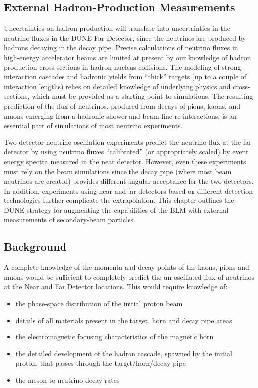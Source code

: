\subsection{External Hadron-Production Measurements}
\label{sec:detectors-nd-external-hadron}

Uncertainties on hadron production will translate into uncertainties in the neutrino fluxes
in the DUNE Far Detector, since the neutrinos are produced by hadrons decaying in the decay pipe. Precise calculations of neutrino fluxes in high-energy accelerator beams are limited
at present by our knowledge of hadron production cross-sections in hadron-nucleus collisions. 
The modeling of strong-interaction cascades and hadronic yields from ``thick'' targets
(up to a couple of interaction lengths) relies on detailed knowledge of underlying physics
and cross-sections, which must be provided as a starting point to simulations. The resulting 
prediction of the flux of neutrinos, produced from decays of pions, kaons, and muons
emerging from a hadronic shower and beam line re-interactions, is an essential part
of simulations of most neutrino experiments. 

Two-detector neutrino oscillation experiments 
predict the neutrino flux at the far detector by using neutrino fluxes ``calibrated'' (or
appropriately scaled) by event energy spectra measured in the near detector. However, even
these experiments must rely on the beam simulations since the decay pipe (where most beam
neutrinos are created) provides different angular acceptance for the two detectors. In addition, 
experiments using near and far detectors based on different detection technologies further complicate the extrapolation. This chapter outlines the DUNE strategy for augmenting the capabilities of the BLM with
external measurements of secondary-beam particles. 

\subsection{Background}

A complete knowledge of the momenta and decay points of the kaons, pions and
muons would be sufficient to completely predict the un-oscillated flux of neutrinos
at the Near and Far Detector locations. This would require knowledge of:

\begin{itemize}
\item the phase-space distribution of the initial proton beam
\item details of all materials present in the target, horn and decay pipe areas
\item  the electromagnetic focusing characteristics of the magnetic horn
\item the detailed development of the hadron cascade, spawned by the
initial proton, that passes through the target/horn/decay pipe
\item the meson-to-neutrino decay rates
\end{itemize}

